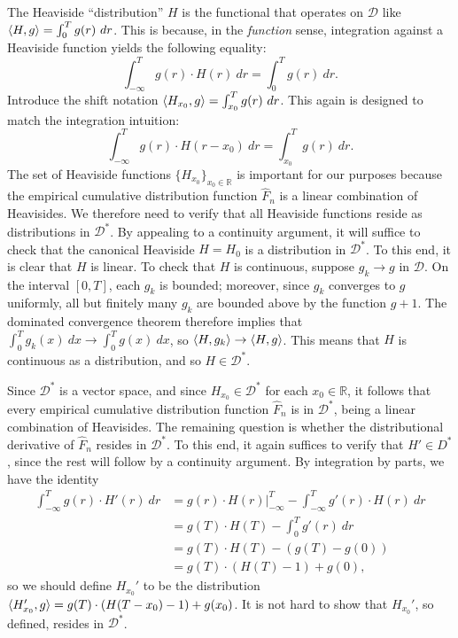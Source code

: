 \documentclass[12pt]{article}
\newcommand{\RR}{\mathbb{R}}
\newcommand{\DD}{\mathcal{D}}
\renewcommand{\hat}{\widehat}
\DeclarePairedDelimiter{\ip}{\langle}{\rangle}
\begin{document}
The Heaviside ``distribution'' $H$ is the functional that operates on
$\DD$ like $\ip{H, g} = \int_0^T g(r) \ dr$. This is because, in the
\emph{function} sense, integration against a Heaviside function yields the
following equality:
\begin{equation*}
  \int_{-\infty}^T g(r) \cdot H(r) \ dr = \int_0^T  g(r) \ dr.
\end{equation*}
Introduce the shift notation $\ip{H_{x_0}, g} = \int_{x_0}^T g(r) \ dr$. This
again is designed to match the integration intuition:
\begin{equation*}
  \int_{-\infty}^T g(r) \cdot H(r-x_0) \ dr = \int_{x_0}^T g(r) \ dr.
\end{equation*}
The set of Heaviside functions $\{H_{x_0}\}_{x_0 \in \RR}$ is important for our
purposes because the empirical cumulative distribution function $\hat{F}_n$ is a
linear combination of Heavisides. We therefore need to verify that all Heaviside
functions reside as distributions in $\DD^*$. By appealing to a continuity
argument, it will suffice to check that the canonical Heaviside $H = H_0$ is a
distribution in $\DD^*$. To this end, it is clear that $H$ is linear. To check
that $H$ is continuous, suppose $g_k \to g$ in $\DD$. On the interval $[0,T]$,
each $g_k$ is bounded; moreover, since $g_k$ converges to $g$ uniformly, all but
finitely many $g_k$ are bounded above by the function $g+1$. The dominated
convergence theorem therefore implies that $\int_0^T g_{k}(x) \ dx \to \int_0^T
g(x) \ dx$, so $\ip{H, g_k} \to \ip{H, g}$. This means that $H$ is continuous as
a distribution, and so $H \in \DD^*$.

Since $\DD^*$ is a vector space, and since $H_{x_0} \in \DD^*$ for each $x_0 \in
\RR$, it follows that every empirical cumulative distribution function
$\hat{F}_n$ is in $\DD^*$, being a linear combination of Heavisides. The
remaining question is whether the distributional derivative of $\hat{F}_n$
resides in $\DD^*$. To this end, it again suffices to verify that $H' \in D^*$,
since the rest will follow by a continuity argument. By integration by parts, we
have the identity
\begin{align*}
  \int_{-\infty}^T g(r) \cdot H'(r) \ dr &= g(r) \cdot H(r) \bigg|_{-\infty}^{T}
  - \int_{-\infty}^{T} g'(r) \cdot H(r) \ dr \\
  &= g(T) \cdot H(T) - \int_0^T g'(r) \ dr \\
  &= g(T) \cdot H(T) - (g(T) - g(0)) \\
  &= g(T) \cdot (H(T) - 1) + g(0),
\end{align*}
so we should define $H_{x_0}'$ to be the distribution $\ip{H_{x_0}', g} = g(T)
\cdot (H(T-x_0) - 1) + g(x_0)$. It is not hard to show that $H_{x_0}'$, so
defined, resides  in $\DD^*$. 
\end{document}

